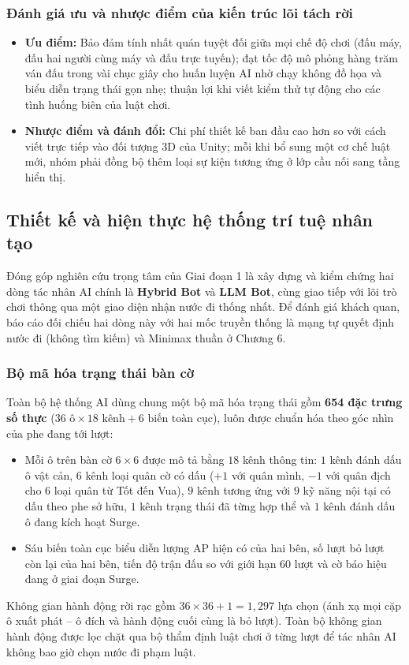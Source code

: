 \subsubsection{Đánh giá ưu và nhược điểm của kiến trúc lõi tách rời}
\begin{itemize}
    \item \textbf{Ưu điểm:} Bảo đảm tính nhất quán tuyệt đối giữa mọi chế độ chơi (đấu máy, đấu hai người cùng máy và đấu trực tuyến); đạt tốc độ mô phỏng hàng trăm ván đấu trong vài chục giây cho huấn luyện AI nhờ chạy không đồ họa và biểu diễn trạng thái gọn nhẹ; thuận lợi khi viết kiểm thử tự động cho các tình huống biên của luật chơi.
    \item \textbf{Nhược điểm và đánh đổi:} Chi phí thiết kế ban đầu cao hơn so với cách viết trực tiếp vào đối tượng 3D của Unity; mỗi khi bổ sung một cơ chế luật mới, nhóm phải đồng bộ thêm loại sự kiện tương ứng ở lớp cầu nối sang tầng hiển thị.
\end{itemize}

\subsection{Thiết kế và hiện thực hệ thống trí tuệ nhân tạo}

Đóng góp nghiên cứu trọng tâm của Giai đoạn 1 là xây dựng và kiểm chứng hai dòng tác nhân AI chính là \textbf{Hybrid Bot} và \textbf{LLM Bot}, cùng giao tiếp với lõi trò chơi thông qua một giao diện nhận nước đi thống nhất. Để đánh giá khách quan, báo cáo đối chiếu hai dòng này với hai mốc truyền thống là mạng tự quyết định nước đi (không tìm kiếm) và Minimax thuần ở Chương 6.

\subsubsection{Bộ mã hóa trạng thái bàn cờ}
Toàn bộ hệ thống AI dùng chung một bộ mã hóa trạng thái gồm \textbf{654 đặc trưng số thực} ($36\text{ ô} \times 18\text{ kênh} + 6\text{ biến toàn cục}$), luôn được chuẩn hóa theo góc nhìn của phe đang tới lượt:
\begin{itemize}
    \item Mỗi ô trên bàn cờ $6 \times 6$ được mô tả bằng $18$ kênh thông tin: $1$ kênh đánh dấu ô vật cản, $6$ kênh loại quân cờ có dấu ($+1$ với quân mình, $-1$ với quân địch cho 6 loại quân từ Tốt đến Vua), $9$ kênh tương ứng với $9$ kỹ năng nội tại có dấu theo phe sở hữu, $1$ kênh trạng thái đã từng hợp thể và $1$ kênh đánh dấu ô đang kích hoạt Surge.
    \item Sáu biến toàn cục biểu diễn lượng AP hiện có của hai bên, số lượt bỏ lượt còn lại của hai bên, tiến độ trận đấu so với giới hạn $60$ lượt và cờ báo hiệu đang ở giai đoạn Surge.
\end{itemize}
Không gian hành động rời rạc gồm $36 \times 36 + 1 = 1{,}297$ lựa chọn (ánh xạ mọi cặp ô xuất phát -- ô đích và hành động cuối cùng là bỏ lượt). Toàn bộ không gian hành động được lọc chặt qua bộ thẩm định luật chơi ở từng lượt để tác nhân AI không bao giờ chọn nước đi phạm luật.

